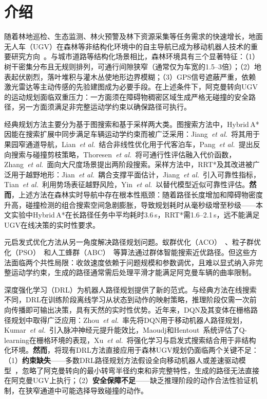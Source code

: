 \documentclass[twocolumn]{elsarticle}
\newcommand{\etal}{\textit{et al.}}
\begin{document}
\section{介绍}\label{sec:intro}

随着林地巡检、生态监测、林火预警及林下资源采集等任务需求的快速增长，地面无人车（UGV）在森林等非结构化环境中的自主导航已成为移动机器人技术的重要研究方向~\cite{thoresen2021path,jian2024path}。与城市道路等结构化场景相比，森林环境具有三个显著特征：（1）树干密集分布且无规则排列，可通行间隙狭窄（通常仅为车宽的1.5--3倍）；（2）地表起伏剧烈，落叶堆积与灌木丛使地形边界模糊；（3）GPS信号遮蔽严重，依赖激光雷达等主动传感的先验建图成为必要手段。在上述条件下，阿克曼转向UGV的运动规划面临双重压力：一方面须在障碍物稠密区域生成严格无碰撞的安全路径，另一方面须满足非完整运动学约束以确保路径可执行。

经典规划方法主要分为基于图搜索和基于采样两大类。图搜索方法中，Hybrid\,A*因能在搜索扩展中同步满足车辆运动学约束而被广泛采用：Jiang~\etal~\cite{jiang2025hybrid}将其用于果园窄通道导航，Lian~\etal~\cite{lian2023trajectory}结合非线性优化用于代客泊车，Pang~\etal~\cite{pang2022curvature}提出反向搜索与碰撞剪枝策略，Thoresen~\etal~\cite{thoresen2021path}将可通行性评估融入代价函数，Zhang~\etal~\cite{zhang2024twostage}面向大尺度场景提出两阶段搜索。采样方法中，RRT*及其改进被广泛用于越野地形：Jian~\etal~\cite{jian2024path}耦合支撑平面估计，Jiang~\etal~\cite{jiang2022r2rrt}引入可靠性指标，Tian~\etal~\cite{tian2023driving}利用势场表征越野风险，Yin~\etal~\cite{yin2023efficient}以替代模型近似可靠性评估。\textbf{然而}，上述方法在森林实时导航中存在根本性瓶颈：随着路径长度增加和障碍物密度升高，碰撞检测的组合搜索空间急剧膨胀，导致规划耗时从毫秒级增至秒级——本文实验中Hybrid\,A*在长路径任务中平均耗时3.6\,s，RRT*需1.6--2.1\,s，远不能满足UGV在线决策的实时性要求。

元启发式优化方法从另一角度解决路径规划问题。蚁群优化（ACO）~\cite{cai2024cooperative,huo2024smooth,li2023mixing}、粒子群优化（PSO）~\cite{xu2022quartic}和人工蜂群（ABC）~\cite{yildirim2025efficient}等算法通过群体智能搜索近优路径。但这些方法面临两个共性局限：收敛速度依赖于问题规模和参数调优，且难以显式纳入非完整运动学约束，生成的路径通常需后处理平滑才能满足阿克曼车辆的曲率限制。

深度强化学习（DRL）为机器人路径规划提供了新的范式。与经典方法在线搜索不同，DRL在训练阶段离线学习从状态到动作的映射策略，推理阶段仅需一次前向传播即可输出决策，具有天然的实时性优势。近年来，DQN及其变体在栅格路径规划中取得广泛应用：Zhou~\etal~\cite{zhou2018dqn}率先将DQN用于移动机器人路径规划，Kumar~\etal~\cite{kumar2025dsqn}引入脉冲神经元提升能效比，Maoudj和Hentout~\cite{maoudj2020optimal}系统评估了Q-learning在栅格环境的表现，Xu~\etal~\cite{xu2026rl}将强化学习与启发式搜索结合用于非结构化环境。\textbf{然而}，将现有DRL方法直接应用于森林UGV规划仍面临两个关键不足：（1）\textbf{约束缺失}——多数DRL路径规划方法假设全向移动机器人或差速驱动模型~\cite{kumar2025dsqn,zhou2018dqn}，忽略了阿克曼转向的最小转弯半径约束和非完整特性，生成的路径无法直接在阿克曼UGV上执行；（2）\textbf{安全保障不足}——缺乏推理阶段的动作合法性验证机制，在狭窄通道中可能选择导致碰撞的动作。
\end{document}
